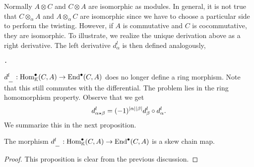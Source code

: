 \documentclass[../thesis.tex]{subfiles}
\begin{document}
            Normally $A\otimes C$ and $C\otimes A$ are isomorphic as modules. In general, it is not true that $C\otimes_\alpha A$ and $A\otimes_\alpha C$ are isomorphic since we have to choose a particular side to perform the twisting. However, if $A$ is commutative and $C$ is cocommutative, they are isomorphic. To illustrate, we realize the unique derivation above as a right derivative. The left derivative $d_\alpha^l$ is then defined analogously,
            \begin{center}
                \tt{.}
            \end{center}

            $d_{\argument}^l : \tt{Hom}_\mathbb{K}^\bullet(C,A) \rightarrow \tt{End}^\bullet(C,A)$ does no longer define a ring morphism. Note that this still commutes with the differential. The problem lies in the ring homomorphism property. Observe that we get
            \begin{align*}
                d_{\alpha\star\beta}^l = (-1)^{|\alpha||\beta|}d_\beta^l\circ d_\alpha^l\tt{.}
            \end{align*}
            We summarize this in the next proposition.

            \begin{proposition}
                The morphism $d_{\argument}^l : \tt{Hom}_\mathbb{K}^\bullet(C,A) \rightarrow \tt{End}^\bullet(C,A)$ is a skew chain map. 
            \end{proposition}

            \begin{proof}
                This proposition is clear from the previous discussion.
            \end{proof}
\end{document}
